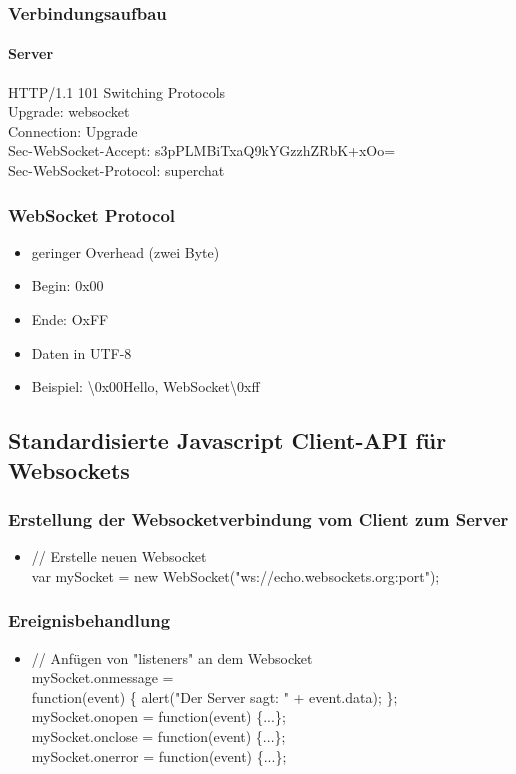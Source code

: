 \documentclass{beamer}
\begin{document}
\begin{frame}
\frametitle{Verbindungsaufbau}
\framesubtitle{Server}
HTTP/1.1 101 Switching Protocols\\
Upgrade: websocket\\
Connection: Upgrade\\
Sec-WebSocket-Accept: s3pPLMBiTxaQ9kYGzzhZRbK+xOo=\\
Sec-WebSocket-Protocol: superchat\\
\end{frame}

\begin{frame}
\frametitle{WebSocket Protocol}
\begin{itemize}
\item geringer Overhead (zwei Byte)
\item Begin: 0x00
\item Ende: OxFF
\item Daten in UTF-8
\item Beispiel: \textbackslash 0x00Hello, WebSocket\textbackslash 0xff
\end{itemize}
\end{frame}

\subsection{Standardisierte Javascript Client-API für Websockets}
\begin{frame}
\frametitle{Erstellung der Websocketverbindung vom Client zum Server}
\begin{itemize}
\item // Erstelle neuen Websocket \\
var mySocket = new WebSocket("ws://echo.websockets.org:port");
\end{itemize}
\end{frame}

\begin{frame}
\frametitle{Ereignisbehandlung}
\begin{itemize}
\item // Anfügen von "listeners" an dem Websocket \\
	mySocket.onmessage = \\function(event) \{ alert("Der Server sagt: " + event.data); \}; \\
mySocket.onopen = function(event) \{...\}; \\
mySocket.onclose = function(event) \{...\}; \\
mySocket.onerror = function(event) \{...\}; \\
\end{itemize}
\end{frame}
\end{document}
